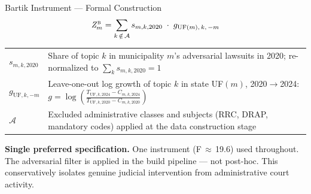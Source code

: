 \documentclass[aspectratio=169,10pt]{beamer}
\newcommand{\bZ}{\mathit{Z}_{m}^{\textsc{b}}}
\begin{document}
\begin{frame}{Bartik Instrument --- Formal Construction}
\[
\bZ = \sum_{k \,\notin\, \mathcal{A}} s_{m,k,2020} \;\cdot\; g_{\text{UF}(m),\,k,\,-m}
\]
\medskip
\renewcommand{\arraystretch}{1.35}
\begin{tabular}{p{2.4cm}p{10.2cm}}
  $s_{m,k,2020}$ & Share of topic $k$ in municipality $m$'s adversarial lawsuits in 2020; re-normalized to $\sum_k s_{m,k,2020} = 1$ \\[4pt]
  $g_{\text{UF},k,-m}$ & Leave-one-out log growth of topic $k$ in state UF$(m)$, 2020$\to$2024:
  $\displaystyle g = \log\!\!\left(\frac{T_{\text{UF},k,2024} - C_{m,k,2024}}{T_{\text{UF},k,2020} - C_{m,k,2020}}\right)$ \\[4pt]
  $\mathcal{A}$ & Excluded administrative classes and subjects (RRC, DRAP, mandatory codes) applied at the data construction stage \\
\end{tabular}

\smallskip
\begin{alertblock}{}
\footnotesize\textbf{Single preferred specification.} One instrument (F\,$\approx$\,19.6) used throughout. The adversarial filter is applied in the build pipeline --- not post-hoc. This conservatively isolates genuine judicial intervention from administrative court activity.
\end{alertblock}
\end{frame}
\end{document}

